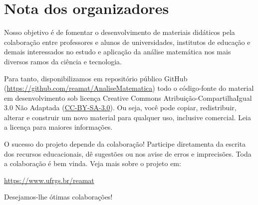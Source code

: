 
\chapter*{Nota dos organizadores}

Nosso objetivo é de fomentar o desenvolvimento de materiais didáticos pela colaboração entre professores e alunos de universidades, institutos de educação e demais interessados no estudo e aplicação da análise matemática nos mais diversos ramos da ciência e tecnologia.

Para tanto, disponibilizamos em repositório público GitHub (\url{https://github.com/reamat/AnaliseMatematica}) todo o código-fonte do material em desenvolvimento sob licença Creative Commons Atribuição-CompartilhaIgual 3.0 Não Adaptada (\href{https://creativecommons.org/licenses/by-sa/3.0/}{CC-BY-SA-3.0}). Ou seja, você pode copiar, redistribuir, alterar e construir um novo material para qualquer uso, inclusive comercial. Leia a licença para maiores informações.

O sucesso do projeto depende da colaboração! Participe diretamenta da escrita dos recursos educacionais, dê sugestões ou nos avise de erros e imprecisões. Toda a colaboração é bem vinda. Veja mais sobre o projeto em:
\begin{center}
  \url{https://www.ufrgs.br/reamat}
\end{center}

\vspace{0.5cm}

Desejamos-lhe ótimas colaborações!

